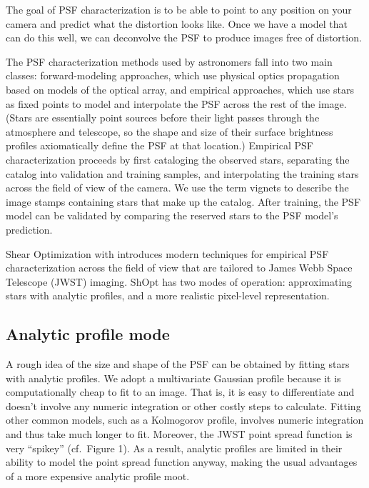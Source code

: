 \documentclass[10pt,a4paper,onecolumn]{article}
\let\textttOrig=\texttt
\def\texttt#1{\expandafter\textttOrig{\seqsplit{#1}}}
\begin{document}
The goal of PSF characterization is to be able to point to any position
on your camera and predict what the distortion looks like. Once we have
a model that can do this well, we can deconvolve the PSF to produce
images free of distortion.

The PSF characterization methods used by astronomers fall into two main
classes: forward-modeling approaches, which use physical optics
propagation based on models of the optical array, and empirical
approaches, which use stars as fixed points to model and interpolate the
PSF across the rest of the image. (Stars are essentially point sources
before their light passes through the atmosphere and telescope, so the
shape and size of their surface brightness profiles axiomatically define
the PSF at that location.) Empirical PSF characterization proceeds by
first cataloging the observed stars, separating the catalog into
validation and training samples, and interpolating the training stars
across the field of view of the camera. We use the term vignets to
describe the image stamps containing stars that make up the catalog.
After training, the PSF model can be validated by comparing the reserved
stars to the PSF model's prediction.

Shear Optimization with \texttt{ShOpt.jl} introduces modern techniques
for empirical PSF characterization across the field of view that are
tailored to James Webb Space Telescope (JWST) imaging. ShOpt has two
modes of operation: approximating stars with analytic profiles, and a
more realistic pixel-level representation.

\hypertarget{analytic-profile-mode}{%
\subsection{Analytic profile mode}\label{analytic-profile-mode}}

A rough idea of the size and shape of the PSF can be obtained by fitting
stars with analytic profiles. We adopt a multivariate Gaussian profile
because it is computationally cheap to fit to an image. That is, it is
easy to differentiate and doesn't involve any numeric integration or
other costly steps to calculate. Fitting other common models, such as a
Kolmogorov profile, involves numeric integration and thus take much
longer to fit. Moreover, the JWST point spread function is very
``spikey'' (cf.~Figure 1). As a result, analytic profiles are limited in
their ability to model the point spread function anyway, making the
usual advantages of a more expensive analytic profile moot.
\end{document}
